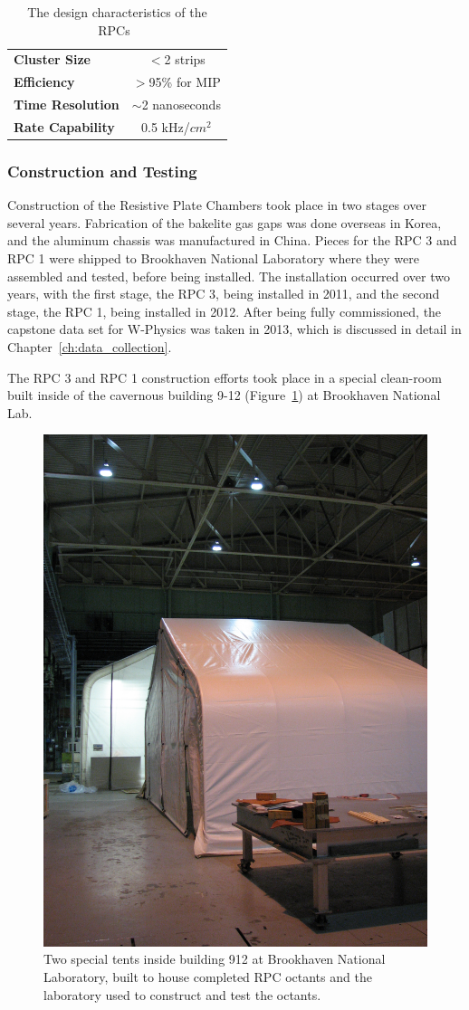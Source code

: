 \begin{table}[ht]
  \centering
  \begin{tabular}{lc}
    \toprule 
    \textbf{Cluster Size} & $<$2 strips \\
    \textbf{Efficiency} & $>$95\% for MIP \\
    \textbf{Time Resolution} & $\sim$2 nanoseconds \\
    \textbf{Rate Capability} & 0.5 kHz/$cm^2$ \\
    \bottomrule
  \end{tabular}
  \caption{
    The design characteristics of the RPCs~\cite{Fukao2011}
  }
  \label{tab:rpc_design_characteristics}
\end{table}

\subsubsection{Construction and Testing}

Construction of the Resistive Plate Chambers took place in two stages over
several years. Fabrication of the bakelite gas gaps was done overseas in Korea,
and the aluminum chassis was manufactured in China. Pieces for the RPC 3 and RPC
1 were shipped to Brookhaven National Laboratory where they were assembled and
tested, before being installed. The installation occurred over two years, with
the first stage, the RPC 3, being installed in 2011, and the second stage, the
RPC 1, being installed in 2012. After being fully commissioned, the capstone
data set for W-Physics was taken in 2013, which is discussed in detail in
Chapter~\ref{ch:data_collection}.

The RPC 3 and RPC 1 construction efforts took place in a special clean-room
built inside of the cavernous building 9-12 (Figure~\ref{fig:building_912}) at
Brookhaven National Lab. 

\begin{figure}
  \centering
  \includegraphics[width=0.5\linewidth]{./figures/building_912_rpc_tent.jpg}
  \caption{
    Two special tents inside building 912 at Brookhaven National Laboratory,
    built to house completed RPC octants and the laboratory used to construct
    and test the octants. 
  }
  \label{fig:building_912}
\end{figure}

